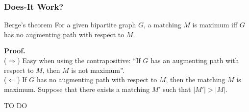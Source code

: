 \documentclass{beamer}
\begin{document}
\begin{frame}%
\frametitle{Does-It Work?}
\scriptsize
\begin{block}{Berge's theorem}
For a given bipartite graph $G$, a matching $M$ is maximum iff $G$ has no augmenting path with respect to $M$.
\end{block}
\textbf{Proof.}\\
($\Rightarrow$)  Easy when using the contrapositive: ``If $G$ has an augmenting path with respect to $M$, then $M$ is not maximum''.\\
\vspace{0.3cm}
($\Leftarrow$) If $G$ has no augmenting path with respect to $M$, then the matching $M$ is maximum.
 Suppose that there exists a matching $M'$ such that $|M'| > |M|$.

TO DO


\end{frame}
\end{document}

